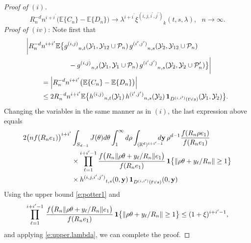 \documentclass[11pt]{amsart}
\numberwithin{equation}{section}
\theoremstyle{plain}
\theoremstyle{definition}
\begin{document}
\begin{proof}[Proof of $(i)$]
$$
R_n^{-d} n^{i + {i^{\prime}}} \bigl( {\mathbb{E}} \{ C_n\}-{\mathbb{E}}\{D_n \}\bigr) \to \lambda^{i+{i^{\prime}}} {\xi^{(i,j,{i^{\prime}},{j^{\prime}})}}_k(t,s,\lambda), \ \ \ n\to\infty.
$$
\textit{Proof of $(iv)$}: Note first that
\begin{align*}
\biggl| R_n^{-d} &n^{i+{i^{\prime}}} {\mathbb{E}} \bigl\{  {g^{(i,j)}}_{n,t}({{\mathcal{Y}}}_1, {{\mathcal{Y}}}_{12} \cup {\mathcal P_n})\, {g^{(i^{\prime},j^{\prime})}}_{n,s}({{\mathcal{Y}}}_2, {{\mathcal{Y}}}_{12} \cup {\mathcal P_n}) \\
&\qquad \qquad - {g^{(i,j)}}_{n,t}({{\mathcal{Y}}}_1, {{\mathcal{Y}}}_1 \cup {\mathcal P_n})\, {g^{(i^{\prime},j^{\prime})}}_{n,s} ({{\mathcal{Y}}}_2, {{\mathcal{Y}}}_2 \cup {\mathcal P_n^{\prime}}) \bigr\}  \biggr| \\
&= \Bigl| R_n^{-d} n^{i+{i^{\prime}}} \bigl( {\mathbb{E}} \{C_n\} - {\mathbb{E}}\{D_n \}\bigr) \Bigr|  \\
&\leq 2R_n^{-d} n^{i+{i^{\prime}}} {\mathbb{E}} \bigl\{ {h^{(i,j)}}_{n,t}({{\mathcal{Y}}}_1)\, {h^{({i^{\prime}},{j^{\prime}})}}_{n,s}({{\mathcal{Y}}}_2)\, {{\bf 1}}_{{D^{(i,{i^{\prime}})}}(t\vee s)}({{\mathcal{Y}}}_1, {{\mathcal{Y}}}_2) \bigr\}.
\end{align*}
Changing the variables in the same manner as in $(i)$, the last expression above equals
\begin{align*}
2 \bigl( nf(R_ne_1) \bigr)^{i+{i^{\prime}}} &\int_{S_{d-1}} J(\theta)d\theta \int_1^{\infty} d\rho \int_{({{\mathbb R}}^d)^{i+{i^{\prime}}-1}} \hspace{-10pt} d{{\bf y}}\, \rho^{d-1} \frac{f(R_n\rho e_1)}{f(R_ne_1)} \\
&\times \prod_{\ell = 1}^{i+{i^{\prime}}-1} \frac{f \bigl(R_n \| \rho \theta + y_\ell/R_n \|e_1 \bigr)}{f(R_ne_1)}\, {{\bf 1}} \bigl\{ \| \rho \theta + y_\ell /R_n  \| \geq 1 \bigr\} \\
&\times  {h^{(i, j, i^{\prime}, j^{\prime})}}_{t,s}(0,{{\bf y}})\, {{\bf 1}}_{{D^{(i,{i^{\prime}})}}(t\vee s)}(0,{{\bf y}})
\end{align*}
Using the upper bound \eqref{e:potter1} and
$$
\prod_{\ell = 1}^{i+{i^{\prime}}-1}\, \frac{f \bigl( R_n \| \rho \theta + y_\ell /R_n \|e_1 \bigr)}{f(R_ne_1)}\, {{\bf 1}} \bigl\{ \| \rho \theta + y_\ell /R_n \| \geq 1 \bigr\} \leq (1+\xi)^{i+{i^{\prime}}-1},
$$
and applying \eqref{e:upper.lambda}, we can complete the proof.
\end{proof}
\end{document}
